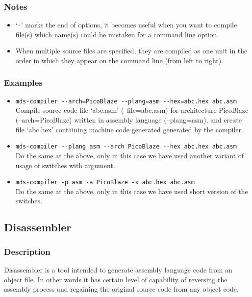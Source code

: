         \subsubsection{Notes}
            \begin{itemize}
                \item `--' marks the end of options, it becomes useful when you want to compile file(s) which name(s) could be mistaken for a command line option.
                \item When multiple source files are specified, they are compiled as one unit in the order in which they appear on the command line (from left to right).
            \end{itemize}

        \subsubsection{Examples}
            \begin{itemize}
                \item \verb'mds-compiler --arch=PicoBlaze --plang=asm --hex=abc.hex abc.asm'\\
                    Compile source code file `abc.asm' (--file=abc.asm) for architecture PicoBlaze (--arch=PicoBlaze) written in assembly language (--plang=asm), and create file `abc.hex' containing machine code generated generated by the compiler.

                \item \verb'mds-compiler --plang asm --arch PicoBlaze --hex abc.hex abc.asm'\\
                    Do the same at the above, only in this case we have used another variant of usage of switches with argument.

                \item \verb'mds-compiler -p asm -a PicoBlaze -x abc.hex abc.asm'\\
                    Do the same at the above, only in this case we have used short version of the switches.
            \end{itemize}

    \subsection{Disassembler}
        \subsubsection{Description}
            Disassembler is a tool intended to generate assembly language code from an object file. In other words it has certain level of capability of reversing the assembly process and regaining the original source code from any object code.

